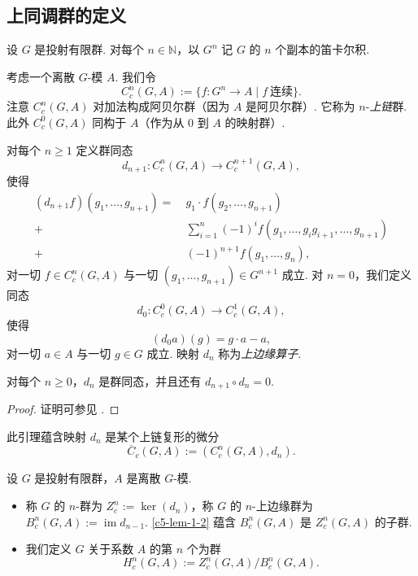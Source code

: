 \subsection{上同调群的定义}
\label{c5-sub-1-2}

设 $G$ 是投射有限群. 对每个 $n\in\mathbb{N}$，以 $G^n$ 记 $G$ 的 $n$ 个副本的笛卡尔积.

考虑一个离散 $G$-模 $A$. 我们令
\[
C^n_c(G,A):=\{f:G^n\to A\mid f\ \text{连续}\}.
\]
注意 $C^n_c(G,A)$ 对加法构成阿贝尔群（因为 $A$ 是阿贝尔群）. 它称为 $n$-\emph{上链}群. 此外 $C^0_c(G,A)$ 同构于 $A$（作为从 $0$ 到 $A$ 的映射群）.

对每个 $n\geq 1$ 定义群同态
\[
d_{n+1}:C^n_c(G,A)\to C^{n+1}_c(G,A),
\]
使得
\[
\begin{aligned}
(d_{n+1}f)(g_1,\ldots,g_{n+1})=\ &g_1\cdot f(g_2,\ldots,g_{n+1})\\
+\ &\sum_{i=1}^{n}(-1)^i f(g_1,\ldots,g_ig_{i+1},\ldots,g_{n+1})\\
+\ &(-1)^{n+1}f(g_1,\ldots,g_n),
\end{aligned}
\]
对一切 $f\in C^n_c(G,A)$ 与一切 $(g_1,\ldots,g_{n+1})\in G^{n+1}$ 成立. 对 $n=0$，我们定义同态
\[
d_0:C^0_c(G,A)\to C^1_c(G,A),
\]
使得
\[
(d_0a)(g)=g\cdot a-a,
\]
对一切 $a\in A$ 与一切 $g\in G$ 成立. 映射 $d_n$ 称为\emph{上边缘算子}.

\begin{lemma}\label{c5-lem-1-2}
对每个 $n\geq 0$，$d_n$ 是群同态，并且还有 $d_{n+1}\circ d_n=0$.
\end{lemma}

\begin{proof}
证明可参见 \cite[Chapter~2, \S2.2]{bur04}.
\end{proof}

\begin{remark}\label{c5-rem-1-6}
此引理蕴含映射 $d_n$ 是某个上链复形的微分
\[
\overline{C}_c(G,A):=(C^n_c(G,A),d_n).
\]
\end{remark}

\begin{definition}\label{c5-def-1-7}
设 $G$ 是投射有限群，$A$ 是离散 $G$-模.
\begin{itemize}
    \item 称 $G$ 的 $n$-群为 $Z^n_c:=\ker(d_n)$，称 $G$ 的 $n$-上边缘群为 $B^n_c(G,A):=\operatorname{im}d_{n-1}$. \autoref{c5-lem-1-2} 蕴含 $B^n_c(G,A)$ 是 $Z^n_c(G,A)$ 的子群.
    \item 我们定义 $G$ 关于系数 $A$ 的第 $n$ 个为群
    \[
    H^n_c(G,A):=Z^n_c(G,A)/B^n_c(G,A).
    \]
\end{itemize}
\end{definition}

